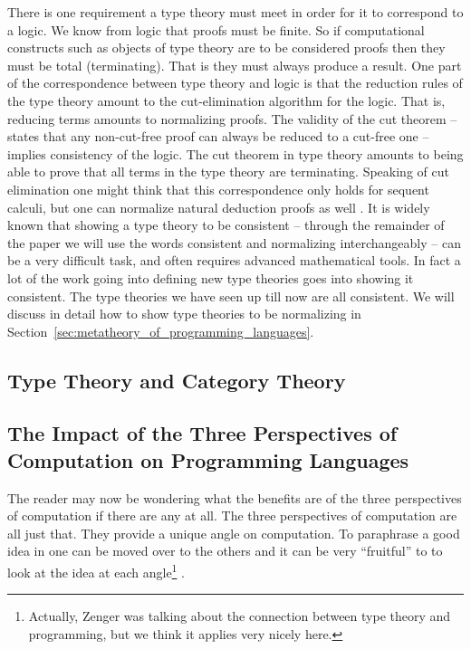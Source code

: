 There is one requirement a type theory must meet in order for it to
correspond to a logic.  We know from logic that proofs must be finite.
So if computational constructs such as objects of type theory are to
be considered proofs then they must be total (terminating).  That is
they must always produce a result.  One part of the correspondence
between type theory and logic is that the reduction rules of the type
theory amount to the cut-elimination algorithm for the logic.  That is,
reducing terms amounts to normalizing proofs.  The validity of the cut
theorem -- states that any non-cut-free proof can always be reduced to
a cut-free one -- implies consistency of the logic.  The cut theorem
in type theory amounts to being able to prove that all terms in the
type theory are terminating.  Speaking of cut elimination one might
think that this correspondence only holds for sequent calculi, but one
can normalize natural deduction proofs as well \cite{Prawitz:1965}.
It is widely known that showing a type theory to be consistent --
through the remainder of the paper we will use the words consistent
and normalizing interchangeably -- can be a very difficult task, and
often requires advanced mathematical tools.  In fact a lot of the work
going into defining new type theories goes into showing it consistent.
The type theories we have seen up till now are all consistent.  We
will discuss in detail how to show type theories to be normalizing in
Section~\ref{sec:metatheory_of_programming_languages}.

\subsection{Type Theory and Category Theory}
\label{subsec:tt_ct}


\subsection{The Impact of the Three Perspectives of Computation on Programming Languages}
\label{subsec:three_perspectives_programming_languages}
The reader may now be wondering what the benefits are of the three
perspectives of computation if there are any at all.  The three
perspectives of computation are all just that.  They provide a unique
angle on computation. To paraphrase \cite{Zenger:1997} a good idea in
one can be moved over to the others and it can be very ``fruitful'' to
to look at the idea at each angle\footnote{Actually, Zenger was
  talking about the connection between type theory and programming,
  but we think it applies very nicely here.} .

